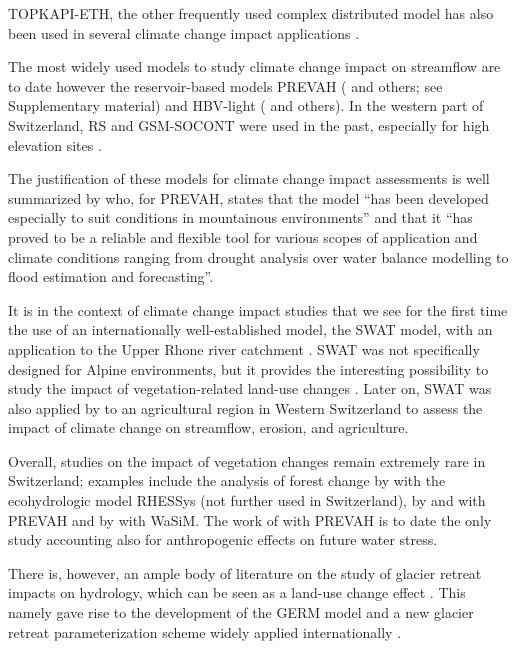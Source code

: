 \documentclass[10pt,a4paper]{article}
\begin{document}
TOPKAPI-ETH, the other frequently used complex distributed model has
also been used in several climate change impact
applications \citep{Fatichi2014,Fatichi2015,Finger_2012,Anghileri2018}. 

{The most widely used models to study climate change impact on
streamflow are to date however the reservoir-based models PREVAH
(}\citealt{Koplin2012,Bosshard2013a,Speich_2015,Junker_2014} and others; 
see Supplementary material) and HBV-light (\citealt{Etter2017,Hakala2020,Brunner_2018,Jenicek2018} 
and others). In the western part of
Switzerland, RS and GSM-SOCONT were used in the past, especially for
high elevation sites \citep{Horton2006,Uhlmann_2012,Uhlmann2013a,Terrier2015}.

The justification of these models for climate change impact assessments
is well summarized by \citet{K_plin_2010} who, for PREVAH, states that
the model ``has been developed especially to suit conditions in
mountainous environments'' and that it ``has proved to be a reliable and
flexible tool for various scopes of application and climate conditions
ranging from drought analysis over water balance modelling to flood
estimation and forecasting''. 

It is in the context of climate change impact studies that we see for
the first time the use of an internationally well-established model, the
SWAT model, with an application to the Upper Rhone river
catchment \citep{Rahman2014}. SWAT was not specifically designed for
Alpine environments, but it provides the interesting possibility to
study the impact of vegetation-related land-use
changes \citep{Rahman2015}. Later on, SWAT was also applied
by \citet{Zarrineh2020} to an agricultural region in Western Switzerland
to assess the impact of climate change on streamflow, erosion, and
agriculture.

Overall, studies on the impact of vegetation changes remain extremely
rare in Switzerland; examples include the analysis of forest change
by \citet{zierl05} with the ecohydrologic model RHESSys (not further
used in Switzerland), by \citet{Koplin2013} and \citet{Schattan2013} with
PREVAH and by \citet{Alaoui2014} with WaSiM. The work
of \citet{Milano2015a} with PREVAH is to date the only study accounting
also for anthropogenic effects on future water stress. 

There is, however, an ample body of literature on the study of glacier
retreat impacts on hydrology, which can be seen as a land-use change
effect \citep{Horton2006,Schaefli2007b,Finger2015,Etter2017,Addor2014,Junghans2011}. 
This namely gave rise to the development of
the GERM model \citep{Huss2016,Junghans2011,Farinotti2012,Finger2013} 
and a new glacier retreat parameterization scheme widely applied
internationally \citep{Huss2010}.
\end{document}
